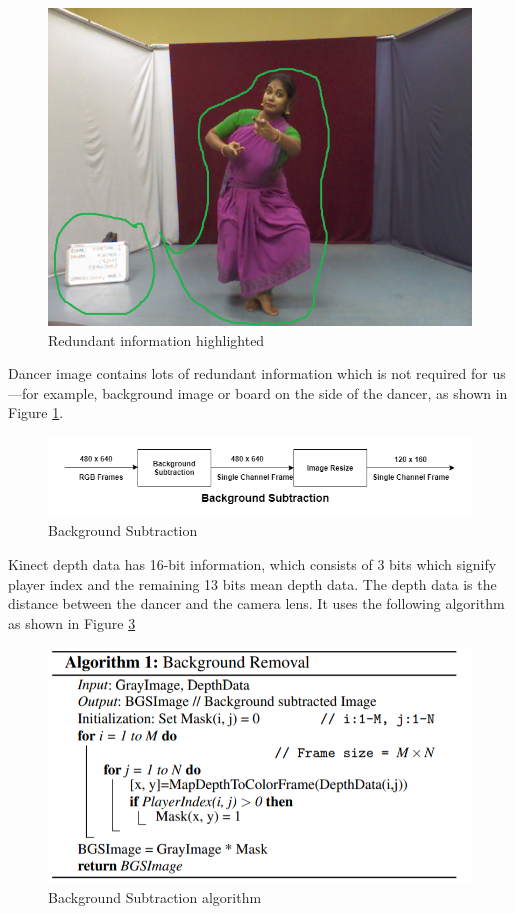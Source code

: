 \begin{figure}[H]
    \centering
    \includegraphics[scale= 0.7]{./Pictures/background_image.png}
    \caption{Redundant information highlighted}
    \label{fig:Ch04F001}
\end{figure}
Dancer image contains lots of redundant information which is not required for us—for example, background image or board on the side of the dancer, as shown in Figure \ref{fig:Ch04F001}. 

\begin{figure}[H]
\centering
  \includegraphics[scale= 0.6]{./Pictures/Algorithm-Background_Subtration.png}
  \caption{Background Subtraction}
  \label{fig:Ch04F002}
\end{figure}


Kinect depth data has 16-bit information, which consists of 3 bits which signify player index and the remaining 13 bits mean depth data. The depth data is the distance between the dancer and the camera lens. It uses the following algorithm as shown in Figure \ref{fig:Ch04F003}

\begin{figure}[H]
\centering
  \includegraphics[scale= 0.7]{./Pictures/algo_image.png}
  \caption{Background Subtraction algorithm}
  \label{fig:Ch04F003}
\end{figure}

